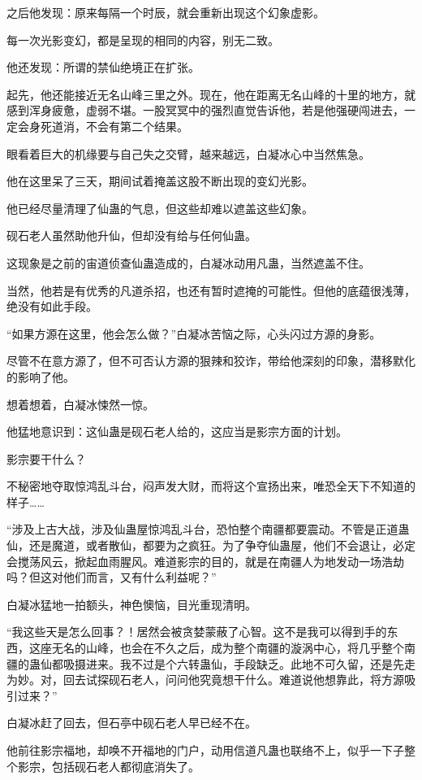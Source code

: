 \begin{this_body}
之后他发现：原来每隔一个时辰，就会重新出现这个幻象虚影。

每一次光影变幻，都是呈现的相同的内容，别无二致。

他还发现：所谓的禁仙绝境正在扩张。

起先，他还能接近无名山峰三里之外。现在，他在距离无名山峰的十里的地方，就感到浑身疲惫，虚弱不堪。一股冥冥中的强烈直觉告诉他，若是他强硬闯进去，一定会身死道消，不会有第二个结果。

眼看着巨大的机缘要与自己失之交臂，越来越远，白凝冰心中当然焦急。

他在这里呆了三天，期间试着掩盖这股不断出现的变幻光影。

他已经尽量清理了仙蛊的气息，但这些却难以遮盖这些幻象。

砚石老人虽然助他升仙，但却没有给与任何仙蛊。

这现象是之前的宙道侦查仙蛊造成的，白凝冰动用凡蛊，当然遮盖不住。

当然，他若是有优秀的凡道杀招，也还有暂时遮掩的可能性。但他的底蕴很浅薄，绝没有如此手段。

“如果方源在这里，他会怎么做？”白凝冰苦恼之际，心头闪过方源的身影。

尽管不在意方源了，但不可否认方源的狠辣和狡诈，带给他深刻的印象，潜移默化的影响了他。

想着想着，白凝冰悚然一惊。

他猛地意识到：这仙蛊是砚石老人给的，这应当是影宗方面的计划。

影宗要干什么？

不秘密地夺取惊鸿乱斗台，闷声发大财，而将这个宣扬出来，唯恐全天下不知道的样子……

“涉及上古大战，涉及仙蛊屋惊鸿乱斗台，恐怕整个南疆都要震动。不管是正道蛊仙，还是魔道，或者散仙，都要为之疯狂。为了争夺仙蛊屋，他们不会退让，必定会搅荡风云，掀起血雨腥风。难道影宗的目的，就是在南疆人为地发动一场浩劫吗？但这对他们而言，又有什么利益呢？”

白凝冰猛地一拍额头，神色懊恼，目光重现清明。

“我这些天是怎么回事？！居然会被贪婪蒙蔽了心智。这不是我可以得到手的东西，这座无名的山峰，也会在不久之后，成为整个南疆的漩涡中心，将几乎整个南疆的蛊仙都吸摄进来。我不过是个六转蛊仙，手段缺乏。此地不可久留，还是先走为妙。对，回去试探砚石老人，问问他究竟想干什么。难道说他想靠此，将方源吸引过来？”

白凝冰赶了回去，但石亭中砚石老人早已经不在。

他前往影宗福地，却唤不开福地的门户，动用信道凡蛊也联络不上，似乎一下子整个影宗，包括砚石老人都彻底消失了。


\end{this_body}

